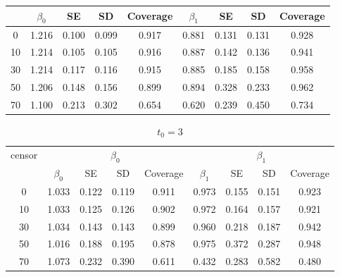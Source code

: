 \documentclass[12pt]{article}
\begin{document}
\begin{enumerate}
\begin{table}[hbt!]
\begin{tabular}{|c|c|c|c|c|c|c|c|c|}
				& $\beta_0$ & SE & SD  & Coverage  & $\beta_1$ & SE & SD & Coverage\\
				\hline\hline
				0 & 1.216 & 0.100 & 0.099 & 0.917 & 0.881 & 0.131 & 0.131 & 0.928 \\ 
  10 & 1.214 & 0.105 & 0.105 & 0.916 & 0.887 & 0.142 & 0.136 & 0.941 \\ 
  30 & 1.214 & 0.117 & 0.116 & 0.915 & 0.885 & 0.185 & 0.158 & 0.958 \\ 
  50 & 1.206 & 0.148 & 0.156 & 0.899 & 0.894 & 0.328 & 0.233 & 0.962 \\ 
  70 & 1.100 & 0.213 & 0.302 & 0.654 & 0.620 & 0.239 & 0.450 & 0.734 \\ 
				\hline
			\end{tabular}
		\end{table}
		\begin{table}[hbt!]
			\caption{$t_0=3$}
			\centering
			\begin{tabular}{|c|c|c|c|c|c|c|c|c|}
				\hline
				\multirow{2}{*}{censor} & \multicolumn{4}{c|}{$\beta_0$} & \multicolumn{4}{c|}{$\beta_1$}\\ \cline{2-9}
				& $\beta_0$ & SE & SD  & Coverage  & $\beta_1$ & SE & SD & Coverage\\
				\hline\hline
				0 & 1.033 & 0.122 & 0.119 & 0.911 & 0.973 & 0.155 & 0.151 & 0.923 \\ 
  10 & 1.033 & 0.125 & 0.126 & 0.902 & 0.972 & 0.164 & 0.157 & 0.921 \\ 
  30 & 1.034 & 0.143 & 0.143 & 0.899 & 0.960 & 0.218 & 0.187 & 0.942 \\ 
  50 & 1.016 & 0.188 & 0.195 & 0.878 & 0.975 & 0.372 & 0.287 & 0.948 \\ 
  70 & 1.073 & 0.232 & 0.390 & 0.611 & 0.432 & 0.283 & 0.582 & 0.480 \\ 
				\hline
			\end{tabular}
		\end{table}
				\newpage


\end{enumerate}
\end{document}
